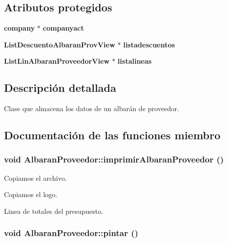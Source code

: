 \subsection*{Atributos protegidos}
\begin{CompactItemize}
\item 
{\bf company} $\ast$ {\bf companyact}\label{classAlbaranProveedor_p0}

\item 
{\bf List\-Descuento\-Albaran\-Prov\-View} $\ast$ {\bf listadescuentos}\label{classAlbaranProveedor_p1}

\item 
{\bf List\-Lin\-Albaran\-Proveedor\-View} $\ast$ {\bf listalineas}\label{classAlbaranProveedor_p2}

\end{CompactItemize}


\subsection{Descripci\'{o}n detallada}
Clase que almacena los datos de un albar\'{a}n de proveedor. 



\subsection{Documentaci\'{o}n de las funciones miembro}
\subsubsection{\setlength{\rightskip}{0pt plus 5cm}void Albaran\-Proveedor::imprimir\-Albaran\-Proveedor ()}\label{classAlbaranProveedor_a6}


Copiamos el archivo.

Copiamos el logo.

Linea de totales del presupuesto. 
\subsubsection{\setlength{\rightskip}{0pt plus 5cm}void Albaran\-Proveedor::pintar ()\hspace{0.3cm}{\tt  [virtual]}}\label{classAlbaranProveedor_a15}


